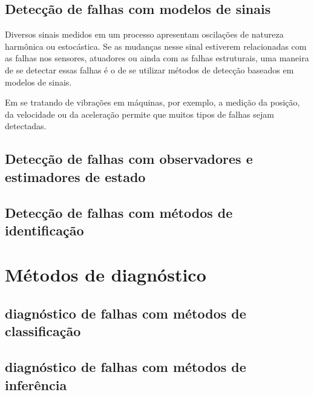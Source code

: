 \subsection{Detecção de falhas com modelos de sinais}
Diversos sinais medidos em um processo apresentam oscilações de natureza
harmônica ou estocástica. Se as mudanças nesse sinal estiverem relacionadas com
as falhas nos sensores, atuadores ou ainda com as falhas estruturais, uma
maneira de se detectar essas falhas é o de se utilizar métodos de detecção
baseados em modelos de sinais.

Em se tratando de vibrações em máquinas, por exemplo, a medição da posição,
da velocidade ou da aceleração permite que muitos tipos de falhas sejam
detectadas.

\subsection{Detecção de falhas com observadores e estimadores de estado}

\subsection{Detecção de falhas com métodos de identificação}

\section{Métodos de diagnóstico}

\subsection{diagnóstico de falhas com métodos de classificação}

\subsection{diagnóstico de falhas com métodos de inferência}

